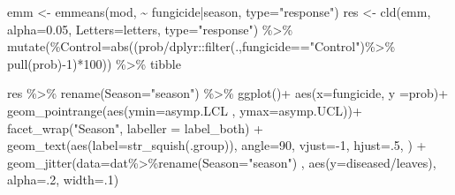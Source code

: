 \documentclass[
  letterpaper,
  DIV=11,
  numbers=noendperiod]{scrartcl}
\newenvironment{Shaded}{\begin{snugshade}}{\end{snugshade}}
\newcommand{\AttributeTok}[1]{\textcolor[rgb]{0.40,0.45,0.13}{#1}}
\newcommand{\DecValTok}[1]{\textcolor[rgb]{0.68,0.00,0.00}{#1}}
\newcommand{\FloatTok}[1]{\textcolor[rgb]{0.68,0.00,0.00}{#1}}
\newcommand{\FunctionTok}[1]{\textcolor[rgb]{0.28,0.35,0.67}{#1}}
\newcommand{\NormalTok}[1]{\textcolor[rgb]{0.00,0.23,0.31}{#1}}
\newcommand{\OtherTok}[1]{\textcolor[rgb]{0.00,0.23,0.31}{#1}}
\newcommand{\SpecialCharTok}[1]{\textcolor[rgb]{0.37,0.37,0.37}{#1}}
\newcommand{\StringTok}[1]{\textcolor[rgb]{0.13,0.47,0.30}{#1}}
\begin{document}
\begin{Shaded}
\begin{Highlighting}[]
\NormalTok{emm }\OtherTok{\textless{}{-}} \FunctionTok{emmeans}\NormalTok{(mod, }\SpecialCharTok{\textasciitilde{}}\NormalTok{ fungicide}\SpecialCharTok{|}\NormalTok{season, }\AttributeTok{type=}\StringTok{"response"}\NormalTok{) }
\NormalTok{res }\OtherTok{\textless{}{-}} \FunctionTok{cld}\NormalTok{(emm, }\AttributeTok{alpha=}\FloatTok{0.05}\NormalTok{, }\AttributeTok{Letters=}\NormalTok{letters,  }\AttributeTok{type=}\StringTok{"response"}\NormalTok{) }\SpecialCharTok{\%\textgreater{}\%} 
   \FunctionTok{mutate}\NormalTok{(}\StringTok{\textasciigrave{}}\AttributeTok{\%Control}\StringTok{\textasciigrave{}}\OtherTok{=}\FunctionTok{abs}\NormalTok{((prob}\SpecialCharTok{/}\NormalTok{dplyr}\SpecialCharTok{::}\FunctionTok{filter}\NormalTok{(.,fungicide}\SpecialCharTok{==}\StringTok{"Control"}\NormalTok{)}\SpecialCharTok{\%\textgreater{}\%} \FunctionTok{pull}\NormalTok{(prob)}\SpecialCharTok{{-}}\DecValTok{1}\NormalTok{)}\SpecialCharTok{*}\DecValTok{100}\NormalTok{)) }\SpecialCharTok{\%\textgreater{}\%} 
\NormalTok{  tibble}

\NormalTok{res }\SpecialCharTok{\%\textgreater{}\%} 
  \FunctionTok{rename}\NormalTok{(}\AttributeTok{Season=}\StringTok{"season"}\NormalTok{) }\SpecialCharTok{\%\textgreater{}\%} 
  \FunctionTok{ggplot}\NormalTok{()}\SpecialCharTok{+}
  \FunctionTok{aes}\NormalTok{(}\AttributeTok{x=}\NormalTok{fungicide, }\AttributeTok{y =}\NormalTok{prob)}\SpecialCharTok{+}
  \FunctionTok{geom\_pointrange}\NormalTok{(}\FunctionTok{aes}\NormalTok{(}\AttributeTok{ymin=}\NormalTok{asymp.LCL , }\AttributeTok{ymax=}\NormalTok{asymp.UCL))}\SpecialCharTok{+}
  \FunctionTok{facet\_wrap}\NormalTok{(}\StringTok{"Season"}\NormalTok{, }\AttributeTok{labeller =}\NormalTok{ label\_both) }\SpecialCharTok{+} \FunctionTok{geom\_text}\NormalTok{(}\FunctionTok{aes}\NormalTok{(}\AttributeTok{label=}\FunctionTok{str\_squish}\NormalTok{(.group)), }\AttributeTok{angle=}\DecValTok{90}\NormalTok{, }\AttributeTok{vjust=}\SpecialCharTok{{-}}\DecValTok{1}\NormalTok{, }\AttributeTok{hjust=}\NormalTok{.}\DecValTok{5}\NormalTok{, ) }\SpecialCharTok{+} 
  \FunctionTok{geom\_jitter}\NormalTok{(}\AttributeTok{data=}\NormalTok{dat}\SpecialCharTok{\%\textgreater{}\%}\FunctionTok{rename}\NormalTok{(}\AttributeTok{Season=}\StringTok{"season"}\NormalTok{) , }\FunctionTok{aes}\NormalTok{(}\AttributeTok{y=}\NormalTok{diseased}\SpecialCharTok{/}\NormalTok{leaves), }\AttributeTok{alpha=}\NormalTok{.}\DecValTok{2}\NormalTok{, }\AttributeTok{width=}\NormalTok{.}\DecValTok{1}\NormalTok{)}
\end{Highlighting}
\end{Shaded}
\end{document}
